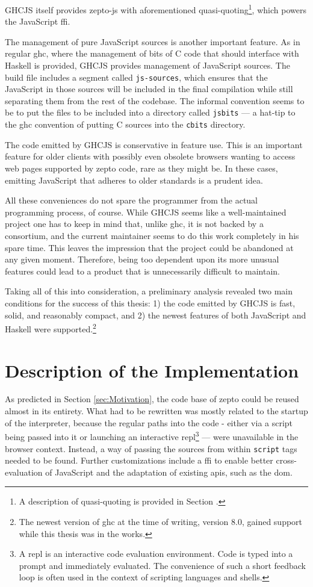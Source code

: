\documentclass[oneside,11pt,xetex]{scrbook}
\begin{document}
GHCJS itself provides zepto-js with aforementioned quasi-quoting\footnote{A description
of quasi-quoting is provided in Section \label{ququ}.}, which powers the JavaScript \gls{ffi}.


The management of pure JavaScript sources is another important feature. As in regular \gls{ghc},
where the management of bits of C code that should interface with Haskell is provided, GHCJS
provides management of JavaScript sources. The build file includes a segment called
\texttt{js-sources}, which ensures that the JavaScript in those sources will be included in the
final compilation while still separating them from the rest of the codebase. The informal convention
seems to be to put the files to be included into a directory called \texttt{jsbits} --- a hat-tip
to the \gls{ghc} convention of putting C sources into the \texttt{cbits} directory.

The code emitted by GHCJS is conservative in feature use. This is an important feature for
older clients with possibly even obsolete browsers wanting to access web pages supported by
zepto code, rare as they might be. In these cases, emitting JavaScript that adheres to older
standards is a prudent idea.

All these conveniences do not spare the programmer from the actual programming process, of course.
While GHCJS seems like a well-maintained project one has to keep in mind that, unlike \gls{ghc},
it is not backed by a consortium, and the current maintainer seems to do this work completely
in his spare time. This leaves the impression that the project could be abandoned at any given
moment. Therefore, being too dependent upon its more unusual features could lead to a product that
is unnecessarily difficult to maintain.

Taking all of this into consideration, a preliminary analysis revealed two main conditions for
the success of this thesis: 1) the code emitted by GHCJS is fast, solid, and reasonably compact,
and 2) the newest features of both JavaScript and Haskell were supported.\footnote{The newest version
of \gls{ghc} at the time of writing, version 8.0, gained support while this thesis was in the works.}

\section{Description of the Implementation}

As predicted in Section \ref{sec:Motivation}, the code base of zepto could be reused almost in its entirety.
What had to be rewritten was mostly related to the startup of the interpreter, because the regular
paths into the code - either via a script being passed into it or launching an interactive
\gls{repl}\footnote{A \gls{repl} is an interactive code evaluation environment. Code is typed into
a prompt and immediately evaluated. The convenience of such a short feedback loop is often used
in the context of scripting languages and shells.} --- were unavailable in the browser context.
Instead, a way of passing the sources from within \texttt{script} tags needed to be found. Further
customizations include a \gls{ffi} to enable better cross-evaluation of JavaScript and the adaptation
of existing \gls{api}s, such as the \gls{dom}.
\end{document}
